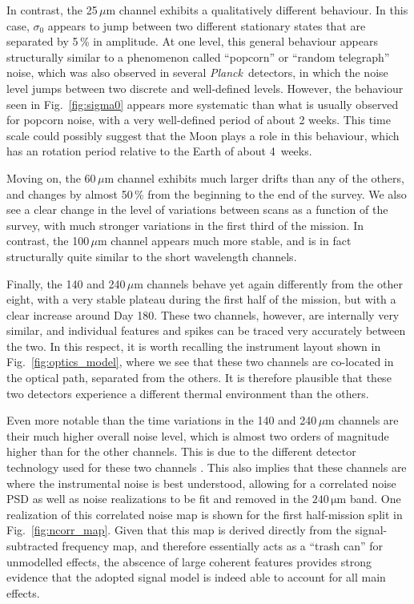 \documentclass{aa}
\def\Planck{\textit{Planck}}
\begin{document}
       
In contrast, the 25$\,\mu$m channel exhibits a qualitatively different
behaviour. In this case, $\sigma_0$ appears to jump between two
different stationary states that are separated by 5\,\% in
amplitude. At one level, this general behaviour appears structurally
similar to a phenomenon called ``popcorn'' or ``random telegraph''
noise, which was also observed in several \Planck\ detectors, in which
the noise level jumps between two discrete and well-defined
levels. However, the behaviour seen in Fig.~\ref{fig:sigma0} appears
more systematic than what is usually observed for popcorn noise, with
a very well-defined period of about 2 weeks. This time scale could
possibly suggest that the Moon plays a role in this behaviour, which
has an rotation period relative to the Earth of about 4~weeks.

Moving on, the 60$\,\mu$m channel exhibits much larger drifts than any
of the others, and changes by almost 50\,\% from the beginning to the
end of the survey. We also see a clear change in the level of
variations between scans as a function of the survey, with much
stronger variations in the first third of the mission. In contrast,
the 100\,$\mu$m channel appears much more stable, and is in fact
structurally quite similar to the short wavelength channels.

Finally, the 140 and 240$\,\mu$m channels behave yet again differently
from the other eight, with a very stable plateau during the first half
of the mission, but with a clear increase around Day 180. These two
channels, however, are internally very similar, and individual
features and spikes can be traced very accurately between the two. In
this respect, it is worth recalling the instrument layout shown in
Fig.~\ref{fig:optics_model}, where we see that these two channels are
co-located in the optical path, separated from the others. It is
therefore plausible that these two detectors experience a different
thermal environment than the others.

Even more notable than the time variations in the 140 and 240$\,\mu$m
channels are their much higher overall noise level, which is almost
two orders of magnitude higher than for the other channels. This is
due to the different detector technology used for these two channels
\citep{hauser1998}.  This also implies that these channels are where
the instrumental noise is best understood, allowing for a correlated
noise PSD as well as noise realizations to be fit and removed in the
$240\,\mathrm{\mu m}$ band. One realization of this correlated noise
map is shown for the first half-mission split in
Fig.~\ref{fig:ncorr_map}. Given that this map is derived directly from
the signal-subtracted frequency map, and therefore essentially acts as
a ``trash can'' for unmodelled effects, the abscence of large coherent
features provides strong evidence that the adopted signal model is
indeed able to account for all main effects. 
\end{document}
